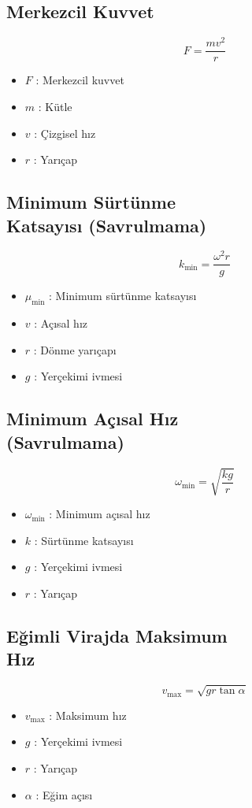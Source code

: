 \documentclass[a4paper, 11pt, titlepage]{article}
\begin{document}
\subsection{Merkezcil Kuvvet}
\[
F = \frac{m v^2}{r}
\]
\begin{itemize}
  \item $F$ : Merkezcil kuvvet
  \item $m$ : Kütle
  \item $v$ : Çizgisel hız
  \item $r$ : Yarıçap
\end{itemize}

\subsection[Minimum Sürtünme Katsayısı]{Minimum Sürtünme \\Katsayısı (Savrulmama)}
\[
k_{\mathrm{min}} = \frac{\omega^2 r}{g}
\]
\begin{itemize}
  \item $\mu_{\mathrm{min}}$ : Minimum sürtünme katsayısı
  \item $v$ : Açısal hız
  \item $r$ : Dönme yarıçapı
  \item $g$ : Yerçekimi ivmesi
\end{itemize}

\subsection[Minimum  Açılsal Hız]{Minimum Açısal Hız \\(Savrulmama)}
\[
\omega_{\mathrm{min}} = \sqrt{\frac{k g}{r}}
\]
\begin{itemize}
  \item $\omega_{\mathrm{min}}$ : Minimum açısal hız
  \item $k$ : Sürtünme katsayısı
  \item $g$ : Yerçekimi ivmesi
  \item $r$ : Yarıçap
\end{itemize}

\subsection[Eğimli Virajda Maksimum Hız]{Eğimli Virajda Maksimum \\ Hız}
\[
v_{\mathrm{max}} = \sqrt{g r \tan \alpha}
\]
\begin{itemize}
  \item $v_{\mathrm{max}}$ : Maksimum hız
  \item $g$ : Yerçekimi ivmesi
  \item $r$ : Yarıçap
  \item $\alpha$ : Eğim açısı
\end{itemize}
\end{document}
